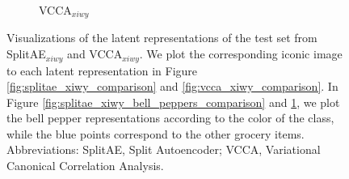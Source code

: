 \begin{figure}[t]
\begin{subfigure}[b]{0.45\textwidth}
         \caption{VCCA$_{xiwy}$}
         \label{fig:vcca_xiwy_bell_peppers_comparison}
     \end{subfigure}
        \caption{Visualizations of the latent representations of the test set from SplitAE$_{xiwy}$ and VCCA$_{xiwy}$. We plot the corresponding iconic image to each latent representation in Figure \ref{fig:splitae_xiwy_comparison} and \ref{fig:vcca_xiwy_comparison}. In Figure \ref{fig:splitae_xiwy_bell_peppers_comparison} and \ref{fig:vcca_xiwy_bell_peppers_comparison}, we plot the bell pepper representations according to the color of the class, while the blue points correspond to the other grocery items. Abbreviations: SplitAE, Split Autoencoder; VCCA, Variational Canonical Correlation Analysis.}
        \label{fig:2d_visualizations_pca_splitae_vcca_comparison}
\end{figure}